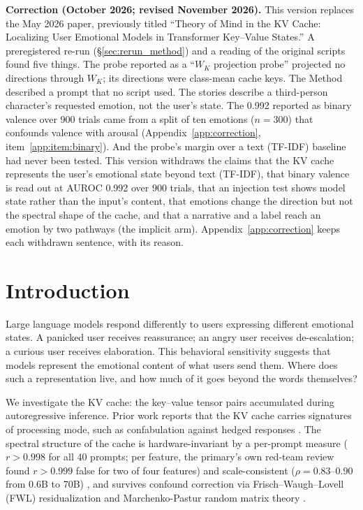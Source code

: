 \documentclass[11pt,a4paper]{article}
\begin{document}
\begin{framed}
\noindent\textbf{Correction (October 2026; revised November 2026).} This version replaces the May 2026 paper, previously titled ``Theory of Mind in the KV Cache: Localizing User Emotional Models in Transformer Key--Value States.'' A preregistered re-run (\S\ref{sec:rerun_method}) and a reading of the original scripts found five things. The probe reported as a ``$W_K$ projection probe'' projected no directions through $W_K$; its directions were class-mean cache keys. The Method described a prompt that no script used. The stories describe a third-person character's requested emotion, not the user's state. The 0.992 reported as binary valence over 900 trials came from a split of ten emotions ($n = 300$) that confounds valence with arousal (Appendix~\ref{app:correction}, item~\ref{app:item:binary}). And the probe's margin over a text (TF-IDF) baseline had never been tested. This version withdraws the claims that the KV cache represents the user's emotional state beyond text (TF-IDF), that binary valence is read out at AUROC 0.992 over 900 trials, that an injection test shows model state rather than the input's content, that emotions change the direction but not the spectral shape of the cache, and that a narrative and a label reach an emotion by two pathways (the implicit arm). Appendix~\ref{app:correction} keeps each withdrawn sentence, with its reason.
\end{framed}

\section{Introduction}

Large language models respond differently to users expressing different emotional states. A panicked user receives reassurance; an angry user receives de-escalation; a curious user receives elaboration. This behavioral sensitivity suggests that models represent the emotional content of what users send them. Where does such a representation live, and how much of it goes beyond the words themselves?

We investigate the KV cache: the key--value tensor pairs accumulated during autoregressive inference. Prior work reports that the KV cache carries signatures of processing mode, such as confabulation against hedged responses \citep{lyra2026oracle}. The spectral structure of the cache is hardware-invariant by a per-prompt measure ($r > 0.998$ for all 40 prompts; per feature, the primary's own red-team review found $r > 0.999$ false for two of four features) and scale-consistent ($\rho = 0.83$--$0.90$ from 0.6B to 70B) \citep{lyra2026detecting}, and survives confound correction via Frisch--Waugh--Lovell (FWL) residualization \citep{frisch1933partial,lovell1963seasonal} and Marchenko-Pastur random matrix theory \citep{lyra2026oracle}.
\end{document}
